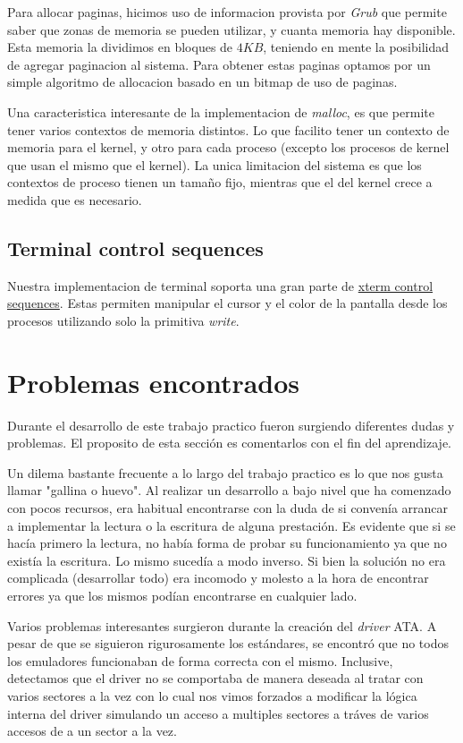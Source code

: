 \documentclass[a4paper,10pt]{article}
\begin{document}
Para allocar paginas, hicimos uso de informacion provista por \textit{Grub} que permite saber que zonas de memoria se pueden utilizar, y cuanta memoria hay disponible.
Esta memoria la dividimos en bloques de $4KB$, teniendo en mente la posibilidad de agregar paginacion al sistema.
Para obtener estas paginas optamos por un simple algoritmo de allocacion basado en un bitmap de uso de paginas.

Una caracteristica interesante de la implementacion de \textit{malloc}, es que permite tener varios contextos de memoria distintos.
Lo que facilito tener un contexto de memoria para el kernel, y otro para cada proceso (excepto los procesos de kernel que usan el mismo que el kernel).
La unica limitacion del sistema es que los contextos de proceso tienen un tamaño fijo, mientras que el del kernel crece a medida que es necesario.

\subsection{Terminal control sequences}
Nuestra implementacion de terminal soporta una gran parte de \href{http://invisible-island.net/xterm/ctlseqs/ctlseqs.html}{xterm control sequences}.
Estas permiten manipular el cursor y el color de la pantalla desde los procesos utilizando solo la primitiva \textit{write}.

\newpage
\section{Problemas encontrados}

Durante el desarrollo de este trabajo practico fueron surgiendo diferentes dudas y problemas. El proposito de esta
sección es comentarlos con el fin del aprendizaje.

Un dilema bastante frecuente a lo largo del trabajo practico es lo que nos gusta llamar "gallina o huevo". Al realizar
un desarrollo a bajo nivel que ha comenzado con pocos recursos, era habitual encontrarse con la duda de si convenía
arrancar a implementar la lectura o la escritura de alguna prestación. Es evidente que si se hacía primero la lectura, 
no había forma de probar su funcionamiento ya que no existía la escritura. Lo mismo sucedía a modo inverso. Si bien 
la solución no era complicada (desarrollar todo) era incomodo y molesto a la hora de encontrar errores ya que los mismos
podían encontrarse en cualquier lado.

Varios problemas interesantes surgieron durante la creación del \textit{driver} ATA. A pesar de que se siguieron
rigurosamente los estándares, se encontró que no todos los emuladores funcionaban de forma correcta con el mismo.
Inclusive, detectamos que el driver no se comportaba de manera deseada al tratar con varios sectores a la vez con lo
cual nos vimos forzados a modificar la lógica interna del driver simulando un acceso a multiples sectores a tráves de
varios accesos de a un sector a la vez.
\end{document}
